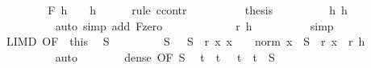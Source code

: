 \begin{isabellebody}
\ \ \isamarkupfalse%
\isanewline
\ \ \ \ \isamarkupfalse%
\ {\isachardoublequoteopen}F\ h\ {\isacharequal}{\kern0pt}\ {}{\isachardoublequoteclose}\ \ h\isanewline
\ \ \ \ \isamarkupfalse%
\ {\isacharparenleft}{\kern0pt}rule\ ccontr{\isacharparenright}{\kern0pt}\isanewline
\ \ \ \ \ \ \isamarkupfalse%
\ {\isacharasterisk}{\kern0pt}{\isacharasterisk}{\kern0pt}{\isacharcolon}{\kern0pt}\ {\isachardoublequoteopen}{\isasymnot}\ {\isacharquery}{\kern0pt}thesis{\isachardoublequoteclose}\isanewline
\ \ \ \ \ \ \isamarkupfalse%
\ \isamarkupfalse%
\ h{\isacharcolon}{\kern0pt}\ {\isachardoublequoteopen}h\ {\isasymnoteq}\ {}{\isachardoublequoteclose}\isanewline
\ \ \ \ \ \ \ \ \isamarkupfalse%
\ {\isacharparenleft}{\kern0pt}auto\ simp\ add{\isacharcolon}{\kern0pt}\ F{\isachardot}{\kern0pt}zero{\isacharparenright}{\kern0pt}\isanewline
\ \ \ \ \ \ \isamarkupfalse%
\ {\isacharasterisk}{\kern0pt}{\isacharasterisk}{\kern0pt}\ \isamarkupfalse%
\ {\isachardoublequoteopen}{}\ {\isacharless}{\kern0pt}\ {\isacharquery}{\kern0pt}r\ h{\isachardoublequoteclose}\isanewline
\ \ \ \ \ \ \ \ \isamarkupfalse%
\ simp\isanewline
\ \ \ \ \ \ \isamarkupfalse%
\ LIM{\isacharunderscore}{\kern0pt}D\ {\isacharbrackleft}{\kern0pt}OF\ {\isacharasterisk}{\kern0pt}\ this{\isacharbrackright}{\kern0pt}\ \isamarkupfalse%
\ S\isanewline
\ \ \ \ \ \ \ \ \ S{\isacharcolon}{\kern0pt}\ {\isachardoublequoteopen}{}\ {\isacharless}{\kern0pt}\ S{\isachardoublequoteclose}\ \ r{\isacharcolon}{\kern0pt}\ {\isachardoublequoteopen}{\isasymAnd}x{\isachardot}{\kern0pt}\ x\ {\isasymnoteq}\ {}\ {\isasymLongrightarrow}\ norm\ x\ {\isacharless}{\kern0pt}\ S\ {\isasymLongrightarrow}\ {\isacharquery}{\kern0pt}r\ x\ {\isacharless}{\kern0pt}\ {\isacharquery}{\kern0pt}r\ h{\isachardoublequoteclose}\isanewline
\ \ \ \ \ \ \ \ \isamarkupfalse%
\ auto\isanewline
\ \ \ \ \ \ \isamarkupfalse%
\ dense\ {\isacharbrackleft}{\kern0pt}OF\ S{\isacharbrackright}{\kern0pt}\ \isamarkupfalse%
\ t\ \ t{\isacharcolon}{\kern0pt}\ {\isachardoublequoteopen}{}\ {\isacharless}{\kern0pt}\ t\ {\isasymand}\ t\ {\isacharless}{\kern0pt}\ S{\isachardoublequoteclose}\ \isacommand{{\isachardot}{\kern0pt}{\isachardot}{\kern0pt}}\isamarkupfalse%
\isanewline
\ \ \ \ \ \ \isamarkupfalse%

\end{isabellebody}
